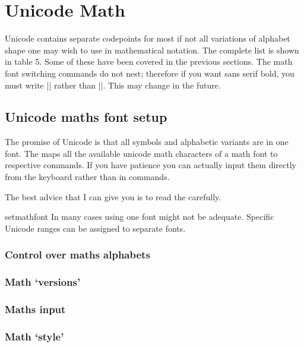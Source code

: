 \chapter{Unicode Math}
Unicode contains separate codepoints for most if not all variations of alphabet
shape one may wish to use in mathematical notation. The complete list is shown
in table 5. Some of these have been covered in the previous sections.
The math font switching commands do not nest; therefore if you want sans
serif bold, you must write || rather than ||.
This may change in the future.

\section{Unicode maths font setup}

The promise of Unicode is that all symbols and alphabetic variants are in one font. The 
maps all the available unicode math characters of a math font to respective \latex commands. If you have patience you can actually input them directly from the keyboard rather than in commands.

The best advice that I can give you is to read the  carefully. 

\begin{docCommand} {setmathfont} {   }
In many cases using one font might not be adequate. Specific Unicode ranges can be assigned to separate fonts.
\end{docCommand}

\subsection{Control over maths alphabets}

\subsection{Math `versions'}

\subsection{Maths input}

\subsection{Math `style'}

